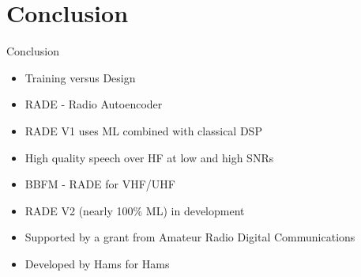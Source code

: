 \documentclass{beamer}
\begin{document}
\section{Conclusion}

\begin{frame}{Conclusion}
\begin{itemize}
	\item Training versus Design
	\item RADE - Radio Autoencoder
	\item RADE V1 uses ML combined with classical DSP
	\item High quality speech over HF at low and high SNRs
	\item BBFM - RADE for VHF/UHF
	\item RADE V2 (nearly 100\% ML) in development
	\item Supported by a grant from Amateur Radio Digital Communications
	\item Developed by Hams for Hams
\end{itemize}

\end{frame}
\end{document}
